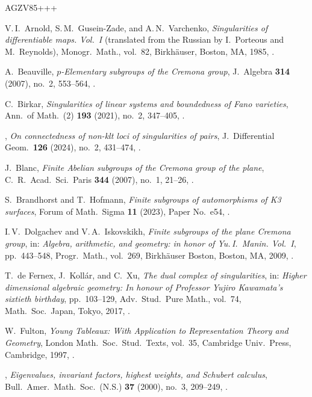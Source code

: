 \documentclass[11pt]{amsart}
\numberwithin{equation}{section}
\theoremstyle{definition}
\theoremstyle{remark}
\begin{document}
\begin{thebibliography}{AGZV85+++}

V.\,I.~Arnold, S.\,M.~Gusein-Zade, and A.\,N.~Varchenko,
{\em Singularities of differentiable maps. Vol.~I} (translated from the Russian by I.~Porteous and M.~Reynolds),
Monogr.\ Math., vol.~82, Birkh\"auser, Boston, MA, 1985,
.

A.~Beauville, 
{\em $p$-Elementary subgroups of the Cremona group},
J.~Algebra \textbf{314} (2007), no.~2, 553--564,
.

C.~Birkar,
{\em Singularities of linear systems and boundedness of Fano varieties},
Ann.\ of Math.~(2) \textbf{193} (2021), no.~2, 347--405,
.

\bysame, 
{\em On connectedness of non-klt loci of singularities of pairs}, 
J.~Differential Geom.\ \textbf{126} (2024), no.~2, 431--474,
.

J.~Blanc,
{\em Finite Abelian subgroups of the Cremona group of the plane},
C.\ R.\ Acad.\ Sci.\ Paris \textbf{344} (2007), no.~1, 21--26,
.

S.~Brandhorst and T.~Hofmann, 
{\em Finite subgroups of automorphisms of K3 surfaces}, 
Forum of Math.\ Sigma \textbf{11} (2023), Paper No.~e54,
.

I.\,V.~Dolgachev and V.\,A.~Iskovskikh, 
{\em Finite subgroups of the plane Cremona group},
in: {\em Algebra, arithmetic, and geometry: in honor of Yu.\,I.~Manin. 
Vol.~I}, pp.~443--548, Progr.\ Math., vol.~269, Birkh\"auser Boston,
Boston, MA, 2009,
.

T.~de Fernex, J.~Koll\'ar, and C.~Xu,
{\em The dual complex of singularities},
in: {\em Higher dimensional algebraic geometry: In honour of Professor Yujiro Kawamata's sixtieth birthday}, pp.~103--129, Adv.\ Stud.\ Pure Math., vol.~74, Math.\ Soc.\ Japan, Tokyo, 2017,
.

W.~Fulton, 
 {\em Young Tableaux: With Application to Representation Theory and Geometry}, 
 London Math.\ Soc.\ Stud.\ Texts, vol.~35, Cambridge Univ.\ Press, Cambridge, 1997, .

\bysame, 
 {\em Eigenvalues, invariant factors, highest weights, and Schubert calculus},
 Bull.\ Amer.\ Math.\ Soc.\ (N.S.) \textbf{37} (2000), no.~3, 209--249,
 .


\end{thebibliography}
\end{document}
